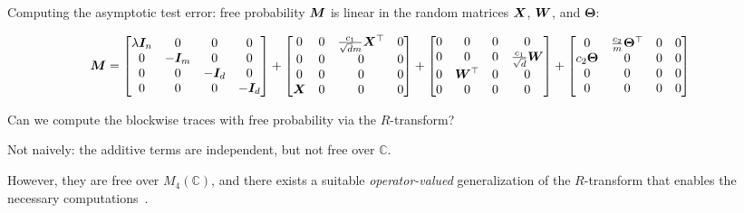 \documentclass[10pt, aspectratio=169]{beamer}
\begin{document}
\begin{frame}[t]{Computing the asymptotic test error: free probability}
${\boldsymbol M}$ is linear in the random matrices ${\boldsymbol X}$, ${\boldsymbol W}$, and $\bm{\Theta}$:

\small 
\begin{align*}
{\boldsymbol M} &= \begin{bmatrix}
\lambda {\boldsymbol I}_n&0&0&0\\
0&-{\boldsymbol I}_m&0&0\\
0&0&-{\boldsymbol I}_d&0\\
0&0&0&-{\boldsymbol I}_d
\end{bmatrix} 
+ 
\begin{bmatrix}
0&0&\tfrac{c_1}{\sqrt{d} m} {\boldsymbol X}^\top&0\\
0&0&0&0\\
0&0&0&0\\
{\boldsymbol X}&0&0&0
\end{bmatrix} +
\begin{bmatrix}
0&0&0&0\\
0&0&0&\tfrac{c_1}{\sqrt{d}} {\boldsymbol W}\\
0&{\boldsymbol W}^\top&0&0\\
0&0&0&0
\end{bmatrix}
+
\begin{bmatrix}
0&\tfrac{c_2}{m}\bm{\Theta}^\top&0&0\\
 c_2 \bm{\Theta}&0&0&0\\
0&0&0&0\\
0&0&0&0
\end{bmatrix}
\end{align*}

Can we compute the blockwise traces with free probability via the $R$-transform?
\pause

Not naively: the additive terms are independent, but not free over $\mathbb{C}$.

However, they are free over $M_4(\mathbb{C})$, and there exists a suitable \emph{operator-valued} generalization of the $R$-transform that enables the necessary computations~\citep{mingo2017free}.

\end{frame}
\end{document}
